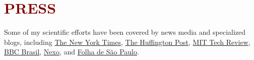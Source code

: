 \section*{\textcolor{maroon}{\normalsize PRESS}} 

Some of my scientific efforts have been covered by news media and specialized blogs, including \href{http://www.nytimes.com/2013/08/11/sunday-review/i-flirt-and-tweet-follow-me-at-socialbot.html?_r=2&}{The New York Times}, \href{http://www.huffingtonpost.com/2013/07/08/twitter-bots-influence_n_3542561.html}{The Huffington Post}, \href{https://www.technologyreview.com/s/608216/twitters-glass-ceiling-revealed-for-women-and-minority-races/}{MIT Tech Review}, \href{https://www.bbc.com/portuguese/brasil-44325458}{BBC Brasil}, \href{https://www.nexojornal.com.br/expresso/2017/11/15/Como-o-Twitter-reproduz-desigualdades-de-gênero-e-raça-do-mundo-offline}{Nexo}, and \href{http://www1.folha.uol.com.br/fsp/tec/124695-robo-social.shtml}{Folha de São Paulo}.


